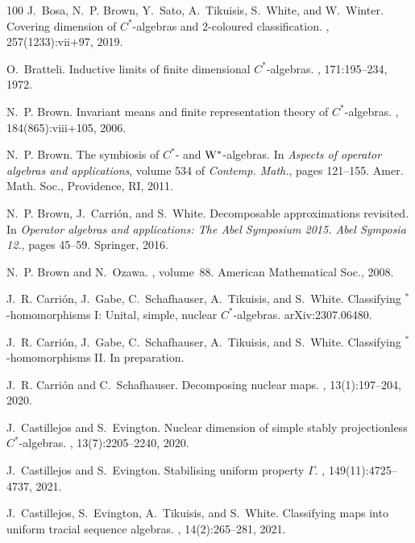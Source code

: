 \documentclass[a4paper,11pt]{amsart}
\theoremstyle{definition}
\numberwithin{equation}{section}
\numberwithin{theorem}{section}
\begin{document}
\begin{thebibliography}{100}
J.~Bosa, N.~P. Brown, Y.~Sato, A.~Tikuisis, S.~White, and W.~Winter.
\newblock Covering dimension of {$C^*$}-algebras and 2-coloured classification.
, 257(1233):vii+97, 2019.

O.~Bratteli.
\newblock Inductive limits of finite dimensional {$C^{*} $}-algebras.
, 171:195--234, 1972.

N.~P. Brown.
\newblock Invariant means and finite representation theory of {$C^*$}-algebras.
, 184(865):viii+105, 2006.

N.~P. Brown.
\newblock The symbiosis of {$C^*$}- and {$\rm W^*$}-algebras.
\newblock In {\em Aspects of operator algebras and applications}, volume 534 of
  {\em Contemp. Math.}, pages 121--155. Amer. Math. Soc., Providence, RI, 2011.

N.~P. Brown, J.~Carri{\'o}n, and S.~White.
\newblock Decomposable approximations revisited.
\newblock In {\em Operator algebras and applications: The Abel Symposium 2015.
  Abel Symposia 12.}, pages 45--59. Springer, 2016.

N.~P. Brown and N.~Ozawa.
,
  volume~88.
\newblock American Mathematical Soc., 2008.

J.~R. Carri\'on, J.~Gabe, C.~Schafhauser, A.~Tikuisis, and S.~White.
\newblock Classifying {$^*$}-homomorphisms {I}: Unital, simple, nuclear
  {$C^*$}-algebras.
\newblock arXiv:2307.06480.

J.~R. Carri\'on, J.~Gabe, C.~Schafhauser, A.~Tikuisis, and S.~White.
\newblock Classifying {$^*$}-homomorphisms {II}.
\newblock In preparation.

J.~R. Carri\'{o}n and C.~Schafhauser.
\newblock Decomposing nuclear maps.
, 13(1):197--204, 2020.

J.~Castillejos and S.~Evington.
\newblock Nuclear dimension of simple stably projectionless {$C^*$}-algebras.
, 13(7):2205--2240, 2020.

J.~Castillejos and S.~Evington.
\newblock Stabilising uniform property {$\Gamma$}.
, 149(11):4725--4737, 2021.

J.~Castillejos, S.~Evington, A.~Tikuisis, and S.~White.
\newblock Classifying maps into uniform tracial sequence algebras.
, 14(2):265--281, 2021.


\end{thebibliography}
\end{document}
